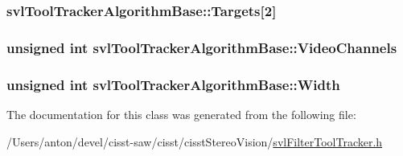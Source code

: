 \subsubsection[{Targets}]{ svl\+Tool\+Tracker\+Algorithm\+Base\+::\+Targets\mbox{[}2\mbox{]}\hspace{0.3cm}{\ttfamily [protected]}}\label{classsvl_tool_tracker_algorithm_base_a60811608667d44f5efc93eb6bedd4a90}
\hypertarget{classsvl_tool_tracker_algorithm_base_a9daba631208a063814d5401631af6d63}{}
\subsubsection[{Video\+Channels}]{\setlength{\rightskip}{0pt plus 5cm}unsigned int svl\+Tool\+Tracker\+Algorithm\+Base\+::\+Video\+Channels\hspace{0.3cm}{\ttfamily [protected]}}\label{classsvl_tool_tracker_algorithm_base_a9daba631208a063814d5401631af6d63}
\hypertarget{classsvl_tool_tracker_algorithm_base_a5dc173e2176c626b0550a2b6d4ef8f93}{}
\subsubsection[{Width}]{\setlength{\rightskip}{0pt plus 5cm}unsigned int svl\+Tool\+Tracker\+Algorithm\+Base\+::\+Width\hspace{0.3cm}{\ttfamily [protected]}}\label{classsvl_tool_tracker_algorithm_base_a5dc173e2176c626b0550a2b6d4ef8f93}


The documentation for this class was generated from the following file\+:\begin{DoxyCompactItemize}
\item 
/\+Users/anton/devel/cisst-\/saw/cisst/cisst\+Stereo\+Vision/\hyperlink{svl_filter_tool_tracker_8h}{svl\+Filter\+Tool\+Tracker.\+h}\end{DoxyCompactItemize}
